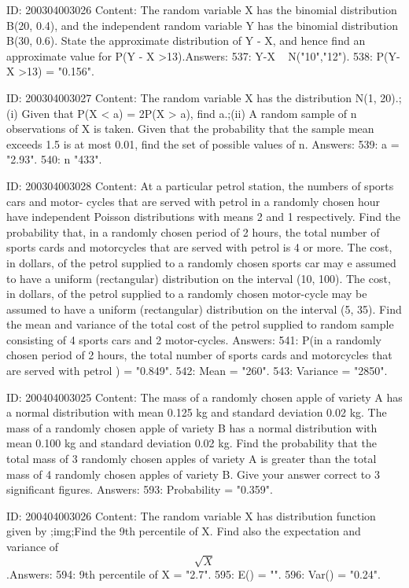 \documentclass{article}
\begin{document}
ID: 200304003026
Content:
The random variable X has the binomial distribution B(20, 0.4), and the independent random variable Y has the binomial distribution B(30, 0.6). State the approximate distribution of Y - X, and hence find an approximate value for P(Y - X >13).Answers:
537: Y-X ~ N("10","12").
538: P(Y-X >13) = "0.156".

ID: 200304003027
Content:
The random variable X has the distribution N(1, 20).;(i) Given that P(X < a) = 2P(X > a), find a.;(ii) A random sample of n observations of X is taken. Given that the probability that the sample mean exceeds 1.5 is at most 0.01, find the set of possible values of n. Answers:
539: a = "2.93".
540: n \geq "433".

ID: 200304003028
Content:
At a particular petrol station, the numbers of sports cars and motor- cycles that are served with petrol in a randomly chosen hour have independent Poisson distributions with means 2 and 1 respectively. Find the probability that, in a randomly chosen period of 2 hours, the total number of sports cards and motorcycles that are served with petrol is 4 or more.  The cost, in dollars, of the petrol supplied to a randomly chosen sports car may e assumed to have a uniform (rectangular) distribution on the interval (10, 100). The cost, in dollars, of the petrol supplied to a randomly chosen motor-cycle may be assumed to have a uniform (rectangular) distribution on the interval (5, 35). Find the mean and variance of the total cost of the petrol supplied to random sample consisting of 4 sports cars and 2 motor-cycles. Answers:
541: P(in a randomly chosen period of 2 hours, the total number of sports cards and motorcycles that are served with petrol ) = "0.849".
542: Mean = "260".
543: Variance = "2850".

ID: 200404003025
Content:
The mass of a randomly chosen apple of variety A has a normal distribution with mean 0.125 kg and standard deviation 0.02 kg. The mass of a randomly chosen apple of variety B has a normal distribution with mean 0.100 kg and standard deviation 0.02 kg. Find the probability that the total mass of 3 randomly chosen apples of variety A is greater than the total mass of 4 randomly chosen apples of variety B.  Give your answer correct to 3 significant figures. Answers:
593: Probability = "0.359".

ID: 200404003026
Content:
The random variable X has distribution function given by ;img;Find the 9th percentile of X. Find also the expectation and variance of $$\sqrt X$$.Answers:
594: 9th percentile of X = "2.7".
595: E() = "".
596: Var() = "0.24".
\end{document}
